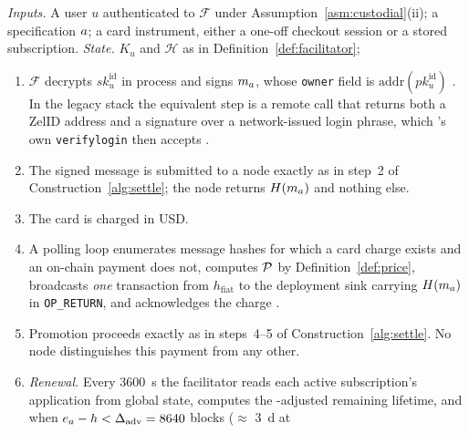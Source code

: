 \begin{construction}
\label{alg:prepay}
\emph{Inputs.} A user $u$ authenticated to $\mathcal{F}$ under Assumption~\ref{asm:custodial}(ii); a
specification $a$; a card instrument, either a one-off checkout session or a stored
subscription.\quad
\emph{State.} $K_u$ and $\mathcal{H}$ as in Definition~\ref{def:facilitator}; 
\begin{enumerate}\setlength{\itemsep}{1pt}
\item $\mathcal{F}$ decrypts $sk^{\mathrm{id}}_u$ in process and signs $m_{a}$, whose \texttt{owner}
      field is $\mathrm{addr}(pk^{\mathrm{id}}_u)$
      . In the legacy stack the
      equivalent step is a remote call that returns both a ZelID address and a signature over a
      network-issued login phrase, which \FluxOS's own \texttt{verifylogin} then accepts
      .
\item The signed message is submitted to a node exactly as in step~2 of
      Construction~\ref{alg:settle}; the node returns $H(m_{a})$ and nothing else.
\item The card is charged in USD.
\item A polling loop enumerates message hashes for which a card charge exists and an on-chain
      payment does not, computes $\mathcal{P}$ by Definition~\ref{def:price}, broadcasts \emph{one}
      transaction from $h_{\mathrm{fiat}}$ to the deployment sink carrying $H(m_{a})$ in
      \texttt{OP\_RETURN}, and acknowledges the charge
      .
\item Promotion proceeds exactly as in steps~4--5 of Construction~\ref{alg:settle}. No node
      distinguishes this payment from any other.
\item \emph{Renewal.} Every \qty{3600}{\second} the facilitator reads each active subscription's
      application from global state, computes the \PoN-adjusted remaining lifetime, and when
      $e_{a} - h < \Delta_{\mathrm{adv}} = \num{8640}$ blocks ($\approx$ \qty{3}{\day} at

\end{enumerate}
\end{construction}
